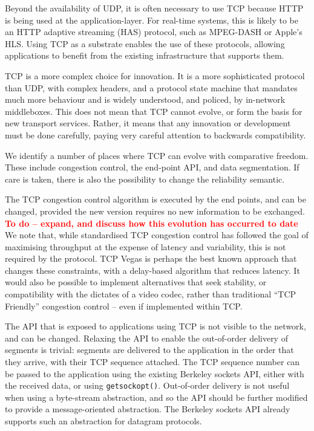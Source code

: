 \documentclass[10pt]{sig-alternate-05-2015}
\newcommand{\todo}[1]{\textbf{\textcolor{red}{To do -- #1}}}
\begin{document}
Beyond the availability of UDP, it is often necessary to use TCP because
HTTP is being used at the application-layer. For real-time systems, this
is likely to be an HTTP adaptive streaming (HAS) protocol, such as
MPEG-DASH or Apple's HLS. Using TCP as a substrate enables the use of these
protocols, allowing applications to benefit from the existing
infrastructure that supports them.

TCP is a more complex choice for innovation. It is a more sophisticated
protocol than UDP, with complex headers, and a protocol state machine
that mandates much more behaviour and is widely understood, and policed,
by in-network middleboxes. This does not mean that TCP cannot evolve, or
form the basis for new transport services. Rather, it means that any
innovation or development must be done carefully, paying very careful
attention to backwards compatibility.

We identify a number of places where TCP can evolve with comparative
freedom. These include congestion control, the end-point API, and data
segmentation. If care is taken, there is also the possibility to change
the reliability semantic.

The TCP congestion control algorithm is executed by the end points, and
can be changed, provided the new version requires no new information to
be exchanged.
\todo{expand, and discuss how this evolution has occurred to date}
We note that, while standardised TCP congestion control has followed the
goal of maximising throughput at the expense of latency and variability,
this is not required by the protocol. TCP Vegas \cite{brakmo:1994:tcp-vegas}
is perhaps the best known approach that changes these constraints, with a
delay-based algorithm that reduces latency. It would also be possible to
implement alternatives that seek stability, or compatibility with the
dictates of a video codec, rather than traditional ``TCP Friendly''
congestion control -- even if implemented within TCP.

The API that is exposed to applications using TCP is not visible to the
network, and can be changed. Relaxing the API to enable the out-of-order
delivery of segments is trivial: segments are delivered to the application
in the order that they arrive, with their TCP sequence attached. The TCP
sequence number can be passed to the application using the existing
Berkeley sockets API, either with the received data, or using
\texttt{getsockopt()}. Out-of-order delivery is not useful when using a
byte-stream abstraction, and so the API should be further modified to
provide a message-oriented abstraction. The Berkeley sockets API already
supports such an abstraction for datagram protocols.
\end{document}
